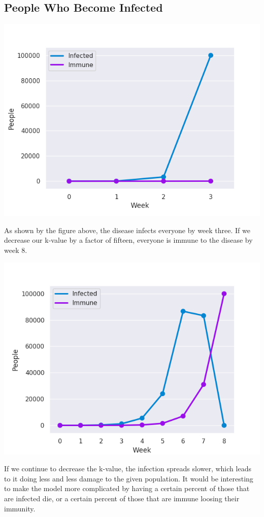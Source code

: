\documentclass[12pt]{article} %
\begin{document}
\begin{itemize}
\section*{People Who Become Infected}


\includegraphics{Actual_Spread.png}

As shown by the figure above, the disease infects everyone by week three. If we decrease our k-value by a factor of fifteen, everyone is immune to the disease by week 8.

\includegraphics{humans_win.png}

If we continue to decrease the k-value, the infection spreads slower, which leads to it doing less and less damage to the given population. It would be interesting to make the model more complicated by having a certain percent of those that are infected die, or a certain percent of those that are immune loosing their immunity.


\end{itemize}
\end{document}
